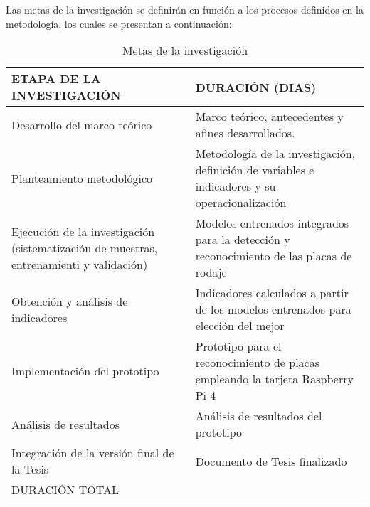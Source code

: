Las metas de la investigación se definirán en función a los procesos definidos
en la metodología, los cuales se presentan a continuación:

\begin{center}
\begin{table}[h]
\caption{Metas de la investigación}
\begin{tabularx}{\textwidth} { 
  | >{\raggedright\arraybackslash}X
  | >{\raggedright\arraybackslash}p{6cm} | } \hline

  \textbf{ETAPA DE LA INVESTIGACIÓN}          & \textbf{DURACIÓN (DIAS)} \\ \hline
  Desarrollo del marco teórico                & Marco teórico, antecedentes y afines desarrollados.                        \\ \hline
  Planteamiento metodológico                  & Metodología de la investigación, definición de variables e indicadores y su operacionalización                        \\ \hline
  Ejecución de la investigación 
  (sistematización de muestras, entrenamienti 
  y validación)                               & Modelos entrenados integrados para la detección y reconocimiento de las placas de rodaje                       \\ \hline
  Obtención y análisis de indicadores         & Indicadores calculados a partir de los modelos entrenados para elección del mejor                        \\ \hline
  Implementación del prototipo                & Prototipo para el reconocimiento de placas empleando la tarjeta Raspberry Pi 4                        \\ \hline
  Análisis de resultados                      & Análisis de resultados del prototipo                        \\ \hline 
  Integración de la versión final de la Tesis & Documento de Tesis finalizado                        \\ \hline 
  DURACIÓN TOTAL                              & 30                       \\ \hline 
  
\end{tabularx}
\end{table}
\end{center}
